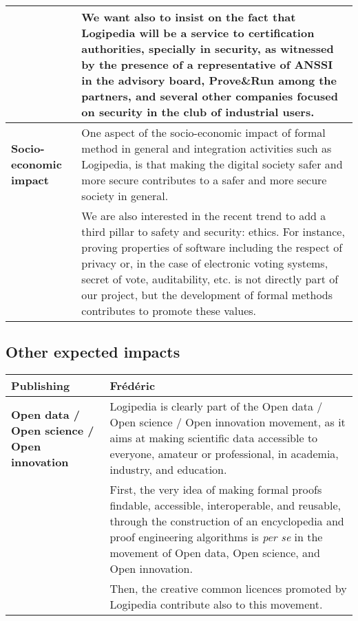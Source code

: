 \begin{longtable}{|p{}|p{}|}
&
\hspace{0.4cm}
We want also to insist on the fact that Logipedia will be a service to
certification authorities, specially in security, as witnessed by the
presence of a representative of ANSSI in the advisory board,
Prove\&Run among the partners, and several other companies focused on
security in the club of industrial users.\\
\hline
{\bf Socio-economic impact}
&
One aspect of the socio-economic impact of formal method in general
and integration activities such as Logipedia, is that making the 
digital society safer and more secure contributes to a safer and more 
secure society in general.\\

&
\hspace{0.4cm} We are also interested in the recent trend to add a
third pillar to safety and security: ethics. For instance, proving
properties of software including the respect of privacy or, in the
case of electronic voting systems, secret of vote, auditability, etc.
is not directly part of our project, but the development of formal
methods contributes to promote these values.\\
\hline
\end{longtable}


\subsection{Other expected impacts}

\begin{longtable}{|p{}|p{}|}
\hline
{\bf Publishing}
&
{\color{red} Frédéric}\\
\hline
{\bf Open data / Open science / Open innovation}
&
Logipedia is clearly part of the Open data / Open science / Open
innovation movement, as it aims at making scientific data accessible
to everyone, amateur or professional, in academia, industry, and
education.\\
&
\hspace{0.4cm}
First, the very idea of making formal proofs findable, accessible,
interoperable, and reusable, through the construction of an
encyclopedia and proof engineering algorithms is {\em per se} in the
movement of Open data, Open science, and Open innovation.\\
&
\hspace{0.4cm}
Then, the creative common licences promoted by Logipedia contribute
also to this movement.\\
\hline
\end{longtable}



